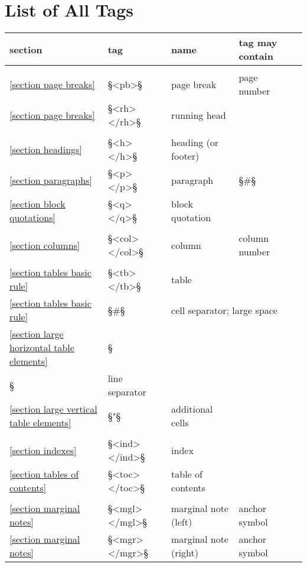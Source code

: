  

\newpage
\appendix


\section{List of All Tags}
\label{appendix list of all tags}

\newcommand{\eins}{{\fontspec{DejaVu Sans}{①}}}

\begin{longtable}[l]{@{}llll@{}l@{}}
section & tag & name & tag may contain \\[1mm]
\hline \\
\ref{section page breaks} & §<pb>§ & page break & page number & \eins \\
\ref{section page breaks} & §<rh> </rh>§ & running head && \eins \\
\\
\ref{section headings} & §<h> </h>§ & heading (or footer) && \eins \\
\ref{section paragraphs} & §<p> </p>§ & paragraph & §#§ & \eins \\
\ref{section block quotations} & §<q> </q>§ & block quotation && \eins \\
\\
\ref{section columns} & §<col> </col>§ & column & column number & \eins \\
\\
\ref{section tables basic rule} & §<tb> </tb>§ & table && \eins \\
\ref{section tables basic rule} & §#§ & \multicolumn{2}{l}{cell separator; large space} \\
\ref{section large horizontal table elements} & §\\§ & line separator && \\
\ref{section large vertical table elements} & §"§ & additional cells && \\
\\
\ref{section indexes} & §<ind> </ind>§ & index && \eins \\
\ref{section tables of contents} & §<toc> </toc>§ & table of contents && \eins \\
\\
\ref{section marginal notes} & §<mgl> </mgl>§ & marginal note (left) & anchor symbol & \eins \\
\ref{section marginal notes} & §<mgr> </mgr>§ & marginal note (right) & anchor symbol & \eins \\

\end{longtable}
